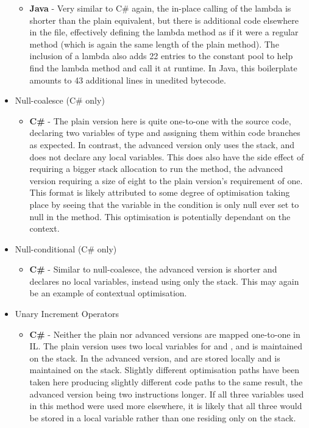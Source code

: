 \documentclass{article}
\begin{document}
\begin{itemize}
\begin{itemize}
                \item \textbf{Java} - Very similar to C\# again, the in-place calling of the lambda is shorter than the plain equivalent, but there is additional code elsewhere in the file, effectively defining the lambda method as if it were a regular method (which is again the same length of the plain method). The inclusion of a lambda also adds 22 entries to the constant pool to help find the lambda method and call it at runtime. In Java, this boilerplate amounts to 43 additional lines in unedited bytecode.
            \end{itemize}
            \item Null-coalesce (C\# only)
            \begin{itemize}
                \item \textbf{C\#} - The plain version here is quite one-to-one with the source code, declaring two variables of type  and assigning them within code branches as expected. In contrast, the advanced version only uses the stack, and does not declare any local variables. This does also have the side effect of requiring a bigger stack allocation to run the method, the advanced version requiring a size of eight to the plain version's requirement of one. This format is likely attributed to some degree of optimisation taking place by seeing that the variable in the condition is only null ever set to null in the method. This optimisation is potentially dependant on the context.
            \end{itemize}
            \item Null-conditional (C\# only)
            \begin{itemize}
                \item \textbf{C\#} - Similar to null-coalesce, the advanced version is shorter and declares no local variables, instead using only the stack. This may again be an example of contextual optimisation.
            \end{itemize}
            \item Unary Increment Operators
            \begin{itemize}
                \item \textbf{C\#} - Neither the plain nor advanced versions are mapped one-to-one in IL. The plain version uses two local variables for  and , and  is maintained on the stack. In the advanced version,  and  are stored locally and  is maintained on the stack. Slightly different optimisation paths have been taken here producing slightly different code paths to the same result, the advanced version being two instructions longer. If all three variables used in this method were used more elsewhere, it is likely that all three would be stored in a local variable rather than one residing only on the stack.

\end{itemize}
\end{itemize}
\end{document}

